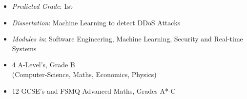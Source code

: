\documentclass[10pt,a4paper,ragged2e]{maltacv}
\begin{document}
\bigskip
{}
\bigskip
\begin{multicols}{2}

  \begin{itemize}
      \item \textit{Predicted Grade}: 1st
      \item \textit{Dissertation}: Machine Learning to detect DDoS Attacks
      \item \textit{Modules in}: Software Engineering, Machine Learning, Security and Real-time Systems
  \end{itemize}

  \begin{itemize}
      \item 4 A-Level’s, Grade B \\ (Computer-Science, Maths,  Economics, Physics)
      \item 12 GCSE’s and FSMQ Advanced Maths, Grades A*-C
  \end{itemize}
  \hspace{0pt}
\end{multicols}
\end{document}
